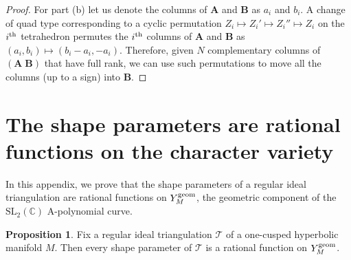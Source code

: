 \documentclass[12pt]{amsart}
\newcommand{\lbl}{\label}
\theoremstyle{definition}
\newtheorem{proposition}[theorem]{Proposition}
\def\BC{\mathbb C}
\def\SL{\mathrm{SL}}
\newcommand{\CT}{\mathcal{T}}
\newcommand{\mb}{\mathbf}
\numberwithin{equation}{section}
\begin{document}
\begin{proof}
For part (b) let us denote the columns of $\mb A$ and $\mb B$ as 
$a_i$ and $b_i$. A change of quad type corresponding to a cyclic
permutation $Z_i\mapsto Z_i'\mapsto Z_i'' \mapsto Z_i$ on 
the $i^{\rm th}$ tetrahedron permutes the $i^{\rm th}$ columns of 
$\mb A$ and $\mb B$ as $(a_i,b_i)\mapsto (b_i-a_i, -a_i)$. Therefore, 
given $N$ complementary columns of $(\mb A\;\mb B)$ that have full rank, 
we can use such permutations to move all the columns (up to a sign) into 
$\mb B$.
\end{proof}





\section{The shape parameters are rational functions on the 
character variety}
\lbl{app.shapes}

In this appendix, we prove that the shape parameters of a regular 
ideal triangulation are rational functions on $Y_M^{\rm geom}$, 
the geometric component of the $\SL_2(\BC)$ A-polynomial curve.

\begin{proposition}
\lbl{prop.shapes}
Fix a regular ideal triangulation $\CT$ of a one-cusped hyperbolic manifold
$M$. Then every shape parameter of $\CT$ is a rational function on 
$Y_M^{\rm geom}$.
\end{proposition}
\end{document}

